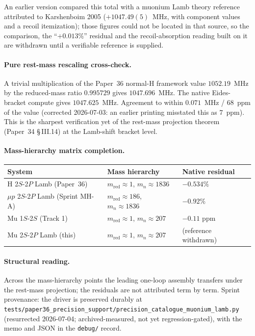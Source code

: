 \documentclass[11pt]{article}
\begin{document}
\noindent An earlier version compared this total with a muonium Lamb
theory reference attributed to Karshenboim 2005 ($+1047.49(5)$~MHz,
with component values and a recoil itemization); those figures could
not be located in that source, so the comparison, the ``$+0.013\%$''
residual and the recoil-absorption reading built on it are withdrawn
until a verifiable reference is supplied.

\paragraph{Pure rest-mass rescaling cross-check.}  A trivial
multiplication of the Paper~36 normal-H framework value $1052.19$~MHz
by the reduced-mass ratio $0.995729$ gives $1047.696$~MHz.  The native
Eides-bracket compute gives $1047.625$~MHz.  Agreement to within
$0.071$~MHz / $68$~ppm of the value (corrected 2026-07-03: an earlier
printing misstated this as $7$~ppm).  This is the sharpest verification
yet of the rest-mass projection theorem (Paper~34 \S\,III.14) at the
Lamb-shift bracket level.

\paragraph{Mass-hierarchy matrix completion.}

\begin{tabular}{lll}
\toprule
System & Mass hierarchy & Native residual \\
\midrule
H 2$S$-2$P$ Lamb (Paper~36) & $m_\text{red} \approx 1$, $m_n \approx 1836$ &
$-0.534\%$ \\
$\mu p$ 2$S$-2$P$ Lamb (Sprint MH-A) &
$m_\text{red} \approx 186$, $m_n \approx 1836$ & $-0.92\%$ \\
Mu 1$S$-2$S$ (Track 1) & $m_\text{red} \approx 1$, $m_n \approx 207$ &
$-0.11$ ppm \\
Mu 2$S$-2$P$ Lamb (this) & $m_\text{red} \approx 1$, $m_n \approx 207$ &
(reference withdrawn) \\
\bottomrule
\end{tabular}

\paragraph{Structural reading.}  Across the mass-hierarchy points the
leading one-loop assembly transfers under the rest-mass projection;
the residuals are not attributed term by term.  Sprint provenance: the driver
is preserved durably at
\texttt{tests/paper36\_precision\_support/precision\_catalogue\_muonium\_lamb.py}
(resurrected 2026-07-04; archived-measured, not yet regression-gated),
with the memo and JSON in the \texttt{debug/} record.
\end{document}
